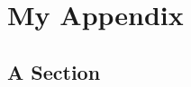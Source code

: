 \chapter{My Appendix}

\section{A Section}
\label{app:section}
\inputminted[fontsize=\scriptsize]{text}{Appendix/section.txt}

